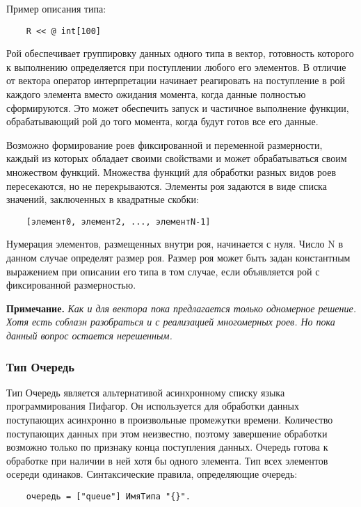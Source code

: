 {Пример описания типа:

\begin{verbatim}
    R << @ int[100]
\end{verbatim}


Рой обеспечивает группировку данных одного типа в вектор, готовность которого к выполнению определяется при поступлении любого его элементов. В отличие от вектора оператор интерпретации начинает реагировать на поступление в рой каждого элемента вместо ожидания момента, когда данные полностью сформируются. Это может обеспечить запуск и частичное выполнение функции, обрабатывающий рой до того момента, когда будут готов все его данные.

Возможно формирование роев фиксированной и переменной размерности, каждый из которых обладает своими свойствами и может обрабатываться своим множеством функций. Множества функций для обработки разных видов роев пересекаются, но не перекрываются. Элементы роя задаются в виде списка значений, заключенных в квадратные скобки:

\begin{verbatim}
    [элемент0, элемент2, ..., элементN-1]
\end{verbatim}

Нумерация элементов, размещенных внутри роя, начинается с нуля. Число N в данном случае определят размер роя. Размер роя может быть задан константным выражением при описании его типа в том случае, если объявляется рой с фиксированной размерностью.

\textbf{Примечание.}
\textit{Как и для вектора пока предлагается только одномерное решение. Хотя есть соблазн разобраться и с реализацией многомерных роев. Но пока данный вопрос остается нерешенным.}

\subsubsection{Тип Очередь}

Тип Очередь является альтернативой асинхронному списку языка программирования Пифагор. Он используется для обработки данных поступающих асинхронно в произвольные промежутки времени. Количество поступающих данных при этом неизвестно, поэтому завершение обработки возможно только по признаку конца поступления данных. Очередь готова к обработке при наличии в ней хотя бы одного элемента. Тип всех элементов осереди одинаков. Синтаксические правила, определяющие очередь:

\begin{verbatim}
    очередь = ["queue"] ИмяТипа "{}".
\end{verbatim}

}
